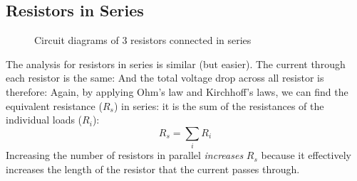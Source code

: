 %
%    
%
%    
%    
%
%  
%
%
%
%
\subsection{Resistors in Series}
\begin{figure}[ht]
  \centering
  \caption{Circuit diagrams of 3 resistors connected in series}
\end{figure}
The analysis for resistors in series is similar (but easier). The current
through each resistor is the same:
And the total voltage drop across all resistor is therefore:
%
%
%
%
Again, by applying Ohm's law and Kirchhoff's laws, we can find the equivalent
resistance ($R_s$) in series: it is the sum of the resistances of the
individual loads ($R_i$):
\begin{equation}
  \boxed{R_s=\sum_iR_i}
\end{equation}
Increasing the number of resistors in parallel \emph{increases} $R_s$ because
it effectively increases the length of the resistor that the current passes
through.




